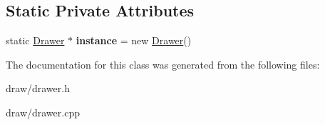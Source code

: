 \subsection*{Static Private Attributes}
\begin{DoxyCompactItemize}
\item 
\mbox{\label{classDrawer_ab085a89adb35d4cc93f1b116543f8753}} 
static \hyperlink{classDrawer}{Drawer} $\ast$ {\bfseries instance} = new \hyperlink{classDrawer}{Drawer}()
\end{DoxyCompactItemize}


The documentation for this class was generated from the following files\+:\begin{DoxyCompactItemize}
\item 
draw/drawer.\+h\item 
draw/drawer.\+cpp\end{DoxyCompactItemize}
